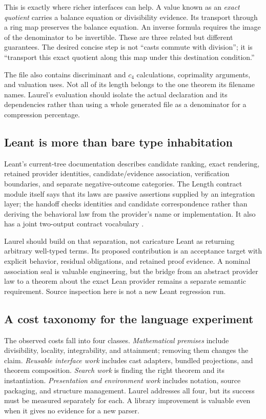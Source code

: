 \documentclass[11pt,a4paper]{article}
\theoremstyle{definition}
\theoremstyle{remark}
\begin{document}
This is exactly where richer interfaces can help. A value known as an \emph{exact quotient} carries a balance equation or divisibility evidence. Its transport through a ring map preserves the balance equation. An inverse formula requires the image of the denominator to be invertible. These are three related but different guarantees. The desired concise step is not ``casts commute with division''; it is ``transport this exact quotient along this map under this destination condition.''

The file also contains discriminant and $c_4$ calculations, coprimality arguments, and valuation uses. Not all of its length belongs to the one theorem its filename names. Laurel's evaluation should isolate the actual declaration and its dependencies rather than using a whole generated file as a denominator for a compression percentage.

\subsection{Leant is more than bare type inhabitation}
Leant's current-tree documentation describes candidate ranking, exact rendering, retained provider identities, candidate/evidence association, verification boundaries, and separate negative-outcome categories. The Length contract module itself says that its laws are passive assertions supplied by an integration layer; the handoff checks identities and candidate correspondence rather than deriving the behavioral law from the provider's name or implementation. It also has a joint two-output contract vocabulary \cite{leantreadme,leantinternals,lengthcontract}.

Laurel should build on that separation, not caricature Leant as returning arbitrary well-typed terms. Its proposed contribution is an acceptance target with explicit behavior, residual obligations, and retained proof evidence. A nominal association seal is valuable engineering, but the bridge from an abstract provider law to a theorem about the exact Lean provider remains a separate semantic requirement. Source inspection here is not a new Leant regression run.

\subsection{A cost taxonomy for the language experiment}
The observed costs fall into four classes. \emph{Mathematical premises} include divisibility, locality, integrability, and attainment; removing them changes the claim. \emph{Reusable interface work} includes cast adapters, bundled projections, and theorem composition. \emph{Search work} is finding the right theorem and its instantiation. \emph{Presentation and environment work} includes notation, source packaging, and structure management. Laurel addresses all four, but its success must be measured separately for each. A library improvement is valuable even when it gives no evidence for a new parser.
\end{document}
